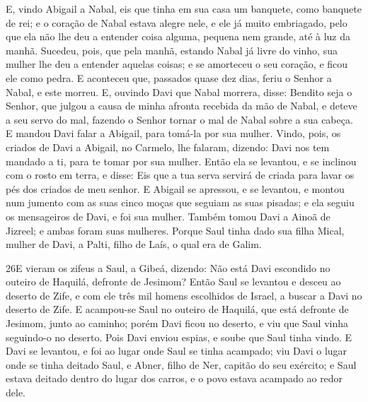 E, vindo Abigail a Nabal, eis que tinha em sua casa um banquete,
como banquete de rei; e o coração de Nabal estava alegre nele, e ele
já muito embriagado, pelo que ela não lhe deu a entender coisa
alguma, pequena nem grande, até à luz da manhã. Sucedeu,
pois, que pela manhã, estando Nabal já livre do vinho, sua mulher
lhe deu a entender aquelas coisas; e se amorteceu o seu coração, e
ficou ele como pedra. E aconteceu que, passados quase dez
dias, feriu o Senhor a Nabal, e este morreu. E, ouvindo Davi
que Nabal morrera, disse: Bendito seja o Senhor, que julgou a causa
de minha afronta recebida da mão de Nabal, e deteve a seu servo do
mal, fazendo o Senhor tornar o mal de Nabal sobre a sua cabeça. E
mandou Davi falar a Abigail, para tomá-la por sua mulher.
Vindo, pois, os criados de Davi a Abigail, no Carmelo, lhe
falaram, dizendo: Davi nos tem mandado a ti, para te tomar por sua
mulher. Então ela se levantou, e se inclinou com o rosto em
terra, e disse: Eis que a tua serva servirá de criada para lavar os
pés dos criados de meu senhor. E Abigail se apressou, e se
levantou, e montou num jumento com as suas cinco moças que seguiam
as suas pisadas; e ela seguiu os mensageiros de Davi, e foi sua
mulher. Também tomou Davi a Ainoã de Jizreel; e ambas foram
suas mulheres. Porque Saul tinha dado sua filha Mical, mulher
de Davi, a Palti, filho de Laís, o qual era de Galim.

\medskip

\lettrine{26} E vieram os zifeus a Saul, a Gibeá, dizendo: Não
está Davi escondido no outeiro de Haquilá, defronte de Jesimom?
Então Saul se levantou e desceu ao deserto de Zife, e com ele
três mil homens escolhidos de Israel, a buscar a Davi no deserto de
Zife. E acampou-se Saul no outeiro de Haquilá, que está defronte
de Jesimom, junto ao caminho; porém Davi ficou no deserto, e viu que
Saul vinha seguindo-o no deserto. Pois Davi enviou espias, e
soube que Saul tinha vindo. E Davi se levantou, e foi ao lugar
onde Saul se tinha acampado; viu Davi o lugar onde se tinha deitado
Saul, e Abner, filho de Ner, capitão do seu exército; e Saul estava
deitado dentro do lugar dos carros, e o povo estava acampado ao
redor dele.

